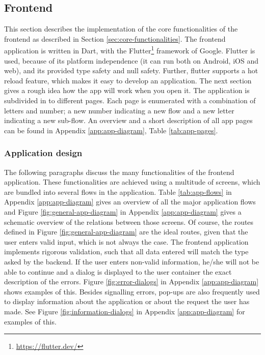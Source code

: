 \subsection{Frontend}\label{sec:implementation-frontend}
This section describes the implementation of the core functionalities of the frontend as described in Section \ref{sec:core-functionalities}. The frontend application is written in Dart, with the Flutter\footnote{\url{https://flutter.dev/}} framework of Google. Flutter is used, because of its platform independence (it can run both on Android, iOS and web), and its provided type safety and null safety. Further, flutter supports a hot reload feature, which makes it easy to develop an application. The next section gives a rough idea how the app will work when you open it. The application is subdivided in to different pages. Each page is enumerated with a combination of letters and number; a new number indicating a new flow and a new letter indicating a new sub-flow. An overview and a short description of all app pages can be found in Appendix \ref{app:app-diagram}, Table \ref{tab:app-pages}.

\subsubsection{Application design}
The following paragraphs discuss the many functionalities of the frontend application. These functionalities are achieved using a multitude of screens, which are bundled into several flows in the application. Table \ref{tab:app-flows} in Appendix \ref{app:app-diagram} gives an overview of all the major application flows and Figure \ref{fig:general-app-diagram} in Appendix \ref{app:app-diagram} gives a schematic overview of the relations between those screens. Of course, the routes defined in Figure \ref{fig:general-app-diagram} are the ideal routes, given that the user enters valid input, which is not always the case. The frontend application implements rigorous validation, such that all data entered will match the type asked by the backend. If the user enters non-valid information, he/she will not be able to continue and a dialog is displayed to the user container the exact description of the errors. Figure \ref{fig:error-dialogs} in Appendix \ref{app:app-diagram} shows examples of this. Besides signalling errors, pop-ups are also frequently used to display information about the application or about the request the user has made. See Figure \ref{fig:information-dialogs} in Appendix \ref{app:app-diagram} for examples of this.


